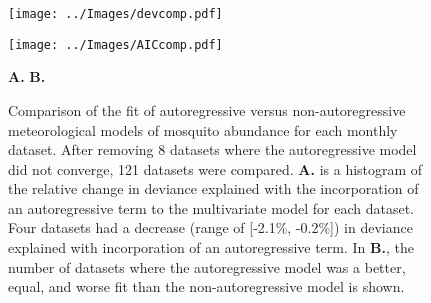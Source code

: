 \begin{figure}[h!]
	\begin{minipage}{.5\textwidth}
		\centering
		\texttt{[image: ../Images/devcomp.pdf]}
	\end{minipage}
	\begin{minipage}{.5\textwidth}
		\centering
		\texttt{[image: ../Images/AICcomp.pdf]}
	\end{minipage}
	\begin{minipage}{\textwidth}
		\vspace{.25cm}
		\hspace{.25\textwidth}
		\textbf{A.}
		\hspace{.47\textwidth}
		\textbf{B.}
	\end{minipage}
	\caption{Comparison of the fit of autoregressive versus non-autoregressive meteorological models of mosquito abundance for each monthly dataset. After removing 8 datasets where the autoregressive model did not converge, 121 datasets were compared. \textbf{A.} is a histogram of the relative change in deviance explained with the incorporation of an autoregressive term to the multivariate model for each dataset. Four datasets had a decrease (range of [-2.1\%, -0.2\%]) in deviance explained with incorporation of an autoregressive term. In \textbf{B.}, the number of datasets where the autoregressive model was a better, equal, and worse fit than the non-autoregressive model is shown. 
	}
\end{figure}

